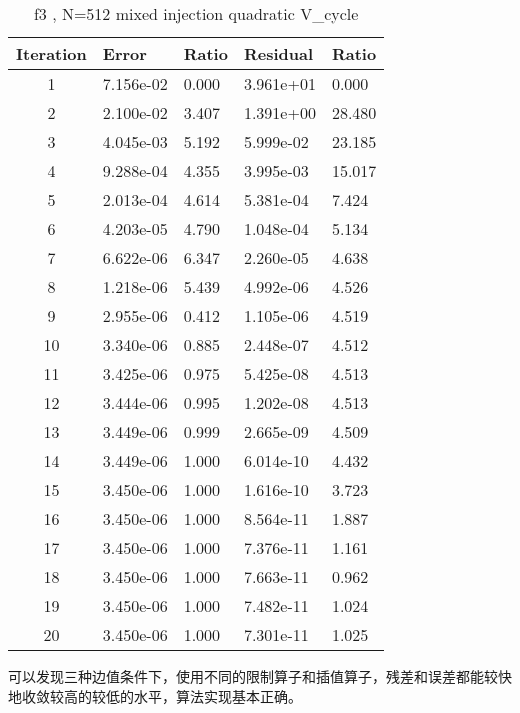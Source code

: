 \documentclass[12]{article}%
\begin{document}
    \begin{table}[H]
        \centering
        \caption{f3 , N=512  mixed injection quadratic V\_cycle}
        \begin{tabular}{|c|l|l|l|l|}
        \hline
        Iteration & Error       & Ratio     & Residual    & Ratio     \\ \hline
        1 & 7.156e-02 & 0.000 & 3.961e+01 & 0.000\\ \hline 
        2 & 2.100e-02 & 3.407 & 1.391e+00 & 28.480\\ \hline 
        3 & 4.045e-03 & 5.192 & 5.999e-02 & 23.185\\ \hline 
        4 & 9.288e-04 & 4.355 & 3.995e-03 & 15.017\\ \hline 
        5 & 2.013e-04 & 4.614 & 5.381e-04 & 7.424\\ \hline 
        6 & 4.203e-05 & 4.790 & 1.048e-04 & 5.134\\ \hline 
        7 & 6.622e-06 & 6.347 & 2.260e-05 & 4.638\\ \hline 
        8 & 1.218e-06 & 5.439 & 4.992e-06 & 4.526\\ \hline 
        9 & 2.955e-06 & 0.412 & 1.105e-06 & 4.519\\ \hline 
        10 & 3.340e-06 & 0.885 & 2.448e-07 & 4.512\\ \hline 
        11 & 3.425e-06 & 0.975 & 5.425e-08 & 4.513\\ \hline 
        12 & 3.444e-06 & 0.995 & 1.202e-08 & 4.513\\ \hline 
        13 & 3.449e-06 & 0.999 & 2.665e-09 & 4.509\\ \hline 
        14 & 3.449e-06 & 1.000 & 6.014e-10 & 4.432\\ \hline 
        15 & 3.450e-06 & 1.000 & 1.616e-10 & 3.723\\ \hline 
        16 & 3.450e-06 & 1.000 & 8.564e-11 & 1.887\\ \hline 
        17 & 3.450e-06 & 1.000 & 7.376e-11 & 1.161\\ \hline 
        18 & 3.450e-06 & 1.000 & 7.663e-11 & 0.962\\ \hline 
        19 & 3.450e-06 & 1.000 & 7.482e-11 & 1.024\\ \hline 
        20 & 3.450e-06 & 1.000 & 7.301e-11 & 1.025\\ \hline       \end{tabular}
    \end{table}

可以发现三种边值条件下，使用不同的限制算子和插值算子，残差和误差都能较快地收敛较高的较低的水平，算法实现基本正确。
\end{document}
